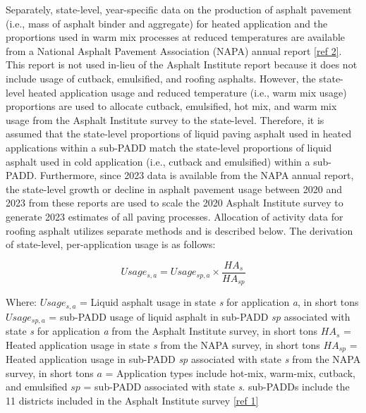 \documentclass[
  11pt,
  oneside]{book}
\begin{document}
Separately, state-level, year-specific data on the production of asphalt pavement (i.e., mass of asphalt binder and aggregate) for heated application and the proportions used in warm mix processes at reduced temperatures are available from a National Asphalt Pavement Association (NAPA) annual report \hyperref[asphalt-references]{{[}ref 2{]}}. This report is not used in-lieu of the Asphalt Institute report because it does not include usage of cutback, emulsified, and roofing asphalts. However, the state-level heated application usage and reduced temperature (i.e., warm mix usage) proportions are used to allocate cutback, emulsified, hot mix, and warm mix usage from the Asphalt Institute survey to the state-level. Therefore, it is assumed that the state-level proportions of liquid paving asphalt used in heated applications within a sub-PADD match the state-level proportions of liquid asphalt used in cold application (i.e., cutback and emulsified) within a sub-PADD. Furthermore, since 2023 data is available from the NAPA annual report, the state-level growth or decline in asphalt pavement usage between 2020 and 2023 from these reports are used to scale the 2020 Asphalt Institute survey to generate 2023 estimates of all paving processes. Allocation of activity data for roofing asphalt utilizes separate methods and is described below. The derivation of state-level, per-application usage is as follows:

\begin{equation} 
  Usage_{s,a} = Usage_{sp,a} \times \frac{HA_{s}}{HA_{sp}}
  \label{eq:state-usage}
\end{equation}

Where: \newline
\(Usage_{s,a}\) = Liquid asphalt usage in state \emph{s} for application \emph{a}, in short tons \newline
\(Usage_{sp,a}\) = sub-PADD usage of liquid asphalt in sub-PADD \emph{sp} associated with state \emph{s} for application \emph{a} from the Asphalt Institute survey, in short tons \newline
\(HA_{s}\) = Heated application usage in state \emph{s} from the NAPA survey, in short tons \newline
\(HA_{sp}\) = Heated application usage in sub-PADD \emph{sp} associated with state \emph{s} from the NAPA survey, in short tons \newline
\(a\) = Application types include hot-mix, warm-mix, cutback, and emulsified \newline
\(sp\) = sub-PADD associated with state \emph{s}. sub-PADDs include the 11 districts included in the Asphalt Institute survey \hyperref[asphalt-references]{{[}ref 1{]}} \newline
\end{document}
